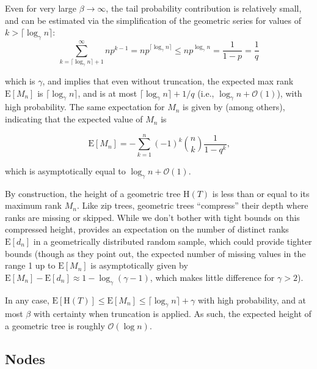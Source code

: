 \documentclass{article}
\begin{document}
Even for very large $\beta \rightarrow \infty$, the tail probability contribution is relatively small, and can be estimated via the simplification of the geometric series for values of $k > \lceil\log_\gamma n\rceil$:
$$
    \sum_{k=\lceil\log_\gamma n\rceil + 1}^\infty n p^{k-1} = n p^{\lceil\log_\gamma n\rceil} \leq n p^{\log_\gamma n} = \frac{1}{1 - p} = \frac{1}{q}
$$

\noindent which is $\gamma$, and implies that even without truncation, the expected max rank $\text{E}[M_n]$ is $\lceil\log_\gamma n\rceil$, and is at most $\lceil\log_\gamma n\rceil + 1 / q$ (i.e., $\log_\gamma n + \mathcal{O}(1)$), with high probability. The same expectation for $M_n$ is given by \cite[eq. (2.6) and (2.12)]{szpankowski1990yet} (among others), indicating that the expected value of $M_n$ is

$$
    \text{E}[M_n] = - \sum_{k = 1}^n (-1)^k \binom{n}{k}\frac{1}{1 - q^k} \text{,}
$$

\noindent which is asymptotically equal to $\log_\gamma n + \mathcal{O}(1)$.

By construction, the height of a geometric tree $\text{H}(T)$ is less than or equal to its maximum rank $M_n$. Like zip trees, geometric trees ``compress'' their depth where ranks are missing or skipped. While we don't bother with tight bounds on this compressed height, \cite{archibald2006number} provides an expectation on the number of distinct ranks $\text{E}[d_n]$ in a geometrically distributed random sample, which could provide tighter bounds (though as they point out, the expected number of missing values in the range 1 up to $\text{E}[M_n]$ is asymptotically given by $\text{E}[M_n] - \text{E}[d_n] \approx 1 - \log_\gamma (\gamma - 1) $, which makes little difference for $\gamma > 2$).

In any case, $\text{E}[\text{H}(T)] \le \text{E}[M_n] \le \lceil\log_\gamma n\rceil + \gamma$ with high probability, and at most $\beta$ with certainty when truncation is applied. As such, the expected height of a geometric tree is roughly $\mathcal{O}(\log n)$.

\subsection{Nodes}
\end{document}
